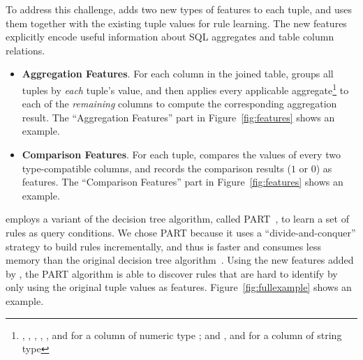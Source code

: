 To address this challenge, \ourtool 
adds two new types of features to each tuple,
and uses them together with the existing tuple values
for rule learning. The new features explicitly
encode useful information about SQL aggregates and
table column relations.

\begin{itemize}

\vspace{-1mm}

\item {\textbf{Aggregation Features}}. For each
column in the joined table, \ourtool 
groups all tuples by \textit{each} tuple's
value, and then applies every applicable aggregate\footnote{
, , ,
, , and  for a
column of numeric type ;
and , and  for
a column of string type } to each of the
 \textit{remaining} columns to compute the corresponding aggregation result. 
The ``Aggregation Features'' part in Figure~\ref{fig:features}
shows an example.

\item {\textbf{Comparison Features}}. For each tuple,
\ourtool compares
the values of every two type-compatible columns, and records
the comparison results ($1$ or $0$) as features.
The ``Comparison Features'' part in Figure~\ref{fig:features}
shows an example.

\end{itemize}



\ourtool employs a variant of the decision tree algorithm,
called PART~\cite{Frank:1998}, to learn a set of rules
as query conditions. We chose PART
because it uses a ``divide-and-conquer'' strategy to 
build rules incrementally, and thus is faster
and consumes less memory than
the original decision tree algorithm~\cite{Quinlan:1986}.
Using the new features added by \ourtool, the
PART algorithm is able to discover rules that are
hard to identify by only using the original tuple values as features.
Figure~\ref{fig:fullexample} shows an example.


